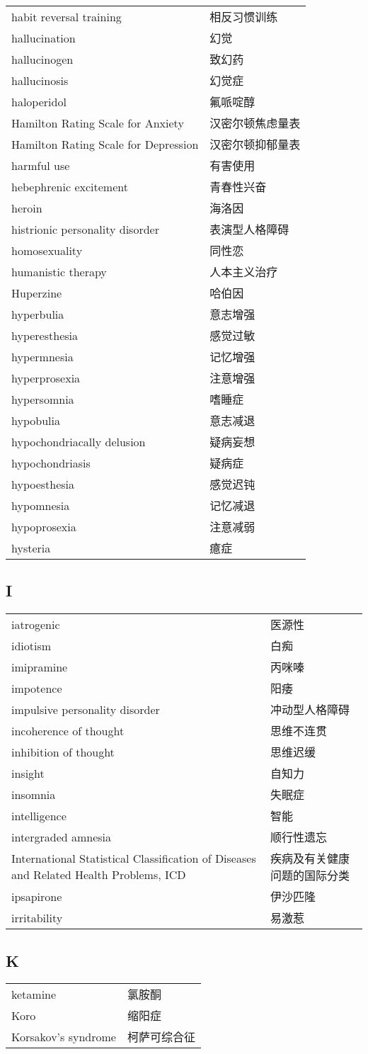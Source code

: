 \begin{longtable}[]{@{}ll@{}}
\toprule
\endhead
habit reversal training & 相反习惯训练\tabularnewline
hallucination & 幻觉\tabularnewline
hallucinogen & 致幻药\tabularnewline
hallucinosis & 幻觉症\tabularnewline
haloperidol & 氟哌啶醇\tabularnewline
Hamilton Rating Scale for Anxiety & 汉密尔顿焦虑量表\tabularnewline
Hamilton Rating Scale for Depression & 汉密尔顿抑郁量表\tabularnewline
harmful use & 有害使用\tabularnewline
hebephrenic excitement & 青春性兴奋\tabularnewline
heroin & 海洛因\tabularnewline
histrionic personality disorder & 表演型人格障碍\tabularnewline
homosexuality & 同性恋\tabularnewline
humanistic therapy & 人本主义治疗\tabularnewline
Huperzine & 哈伯因\tabularnewline
hyperbulia & 意志增强\tabularnewline
hyperesthesia & 感觉过敏\tabularnewline
hypermnesia & 记忆增强\tabularnewline
hyperprosexia & 注意增强\tabularnewline
hypersomnia & 嗜睡症\tabularnewline
hypobulia & 意志减退\tabularnewline
hypochondriacally delusion & 疑病妄想\tabularnewline
hypochondriasis & 疑病症\tabularnewline
hypoesthesia & 感觉迟钝\tabularnewline
hypomnesia & 记忆减退\tabularnewline
hypoprosexia & 注意减弱\tabularnewline
hysteria & 癔症\tabularnewline
\bottomrule
\end{longtable}

\subsection*{I}

\begin{longtable}[]{p{6cm}l}
\toprule
\endhead
iatrogenic & 医源性\tabularnewline
idiotism & 白痴\tabularnewline
imipramine & 丙咪嗪\tabularnewline
impotence & 阳痿\tabularnewline
impulsive personality disorder & 冲动型人格障碍\tabularnewline
incoherence of thought & 思维不连贯\tabularnewline
inhibition of thought & 思维迟缓\tabularnewline
insight & 自知力\tabularnewline
insomnia & 失眠症\tabularnewline
intelligence & 智能\tabularnewline
intergraded amnesia & 顺行性遗忘\tabularnewline
International Statistical Classification 
of Diseases and Related Health
Problems, ICD & 疾病及有关健康问题的国际分类\tabularnewline
ipsapirone & 伊沙匹隆\tabularnewline
irritability & 易激惹\tabularnewline
\bottomrule
\end{longtable}

\subsection*{K}

\begin{longtable}[]{@{}ll@{}}
\toprule
\endhead
ketamine & 氯胺酮\tabularnewline
Koro & 缩阳症\tabularnewline
Korsakov's syndrome & 柯萨可综合征\tabularnewline
\bottomrule
\end{longtable}

